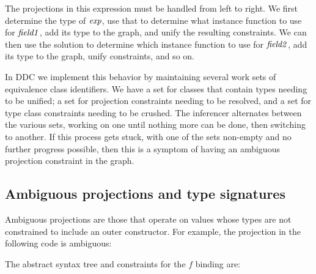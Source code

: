 The projections in this expression must be handled from left to right. We first determine the type of $\operatorname{\mathit{exp}}$, use that to determine what instance function to use for $\operatorname{\mathit{field1}}$, add its type to the graph, and unify the resulting constraints. We can then use the solution to determine which instance function to use for $\operatorname{\mathit{field2}}$, add its type to the graph, unify constraints, and so on.

In DDC we implement this behavior by maintaining several work sets of equivalence class identifiers. We have a set for classes that contain types needing to be unified; a set for projection constraints needing to be resolved, and a set for type class constraints needing to be crushed. The inferencer alternates between the various sets, working on one until nothing more can be done, then switching to another. If this process gets stuck, with one of the sets non-empty and no further progress possible, then this is a symptom of having an ambiguous projection constraint in the graph. 

\clearpage{}
\subsection{Ambiguous projections and type signatures}

Ambiguous projections are those that operate on values whose types are not constrained to include an outer constructor. For example, the projection in the following code is ambiguous:


The abstract syntax tree and constraints for the $f$ binding are:

